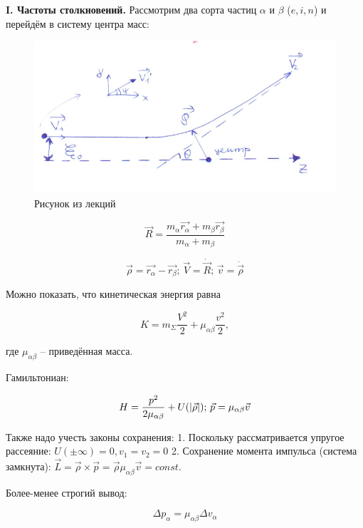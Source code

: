 \documentclass[10pt, a4paper]{article}
\begin{document}
{\bfseries \large I. Частоты столкновений.} Рассмотрим два сорта частиц $\alpha$ и $\beta$ ($e, i, n$) и перейдём в систему центра масс:

\begin{figure}[ht]
	\begin{center}
		\includegraphics[width=0.6\linewidth]{scattering_simple.pdf}
	\end{center}
	\caption{Рисунок из лекций}
	\label{fig:scattering}
\end{figure}

\begin{equation} \label{eq:center_mass}
	\vec{R} = \frac{m_\alpha\vec{r_\alpha}+m_\beta\vec{r_\beta}}{m_\alpha+m_\beta}
\end{equation}

\begin{equation*}
	\vec{\rho} = \vec{r_\alpha}-\vec{r_\beta};\,
	\vec{V} = \dot{\vec{R}};\,
	\vec{v} = \dot{\vec{\rho}}
\end{equation*}

Можно показать, что кинетическая энергия равна

\begin{equation*}
	K = m_\Sigma\frac{V^2}{2}+\mu_{\alpha\beta}\frac{v^2}{2},
\end{equation*}

где $\mu_{\alpha\beta}$ -- приведённая масса. 

Гамильтониан:

\begin{equation*}
	H = \frac{p^2}{2\mu_{\alpha\beta}}+U(\abs{\vec{\rho}});\,
	\vec{p} = \mu_{\alpha\beta}\vec{v}
\end{equation*}

Также надо учесть законы сохранения: 1. Поскольку рассматривается упругое рассеяние: $U(\pm \infty) = 0, v_1 = v_2 = 0$ 2. Сохранение момента импульса (система замкнута): $\vec{L} = \vec{\rho} \times \vec{p} = \vec{\rho} \mu_{\alpha\beta} \vec{v} = const$.

Более-менее строгий вывод:

\begin{equation*}
	\Delta p_\alpha = \mu_{\alpha\beta} \Delta v_\alpha
\end{equation*}
\end{document}
